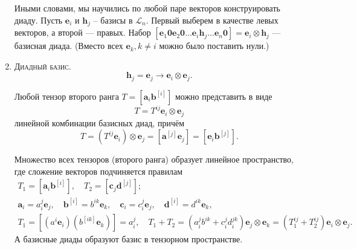 \begin{definition}[геометрическое]
\begin{enumerate}
    Иными словами, мы научились по любой паре векторов конструировать диаду. Пусть $\mathbf{e}_i$ и
    $\mathbf{h}_j$ -- базисы в $\mathcal{L}_n$. Первый выберем в качестве левых векторов, а
    второй --- правых. Набор $[\mathbf{e}_1 \mathbf{0} \mathbf{e}_2 \mathbf{0}
    \dots \mathbf{e}_i \mathbf{h}_j \dots \mathbf{e}_n \mathbf{0}] =
    \mathbf{e}_i \otimes \mathbf{h}_j$ --- базисная диада. (Вместо всех
    $\mathbf{e}_k, k\neq i$ можно было поставить нули.) 

  \item \textsc{Диадный базис.} %
  	\begin{equation*}
  		\mathbf{h}_j = \mathbf{e}_j \longrightarrow \mathbf{e}_i \otimes
      \mathbf{e}_j.
  	\end{equation*}
  
    \begin{theorem}
      Любой тензор второго ранга $ T = [\mathbf{a}_i \mathbf{b}^{[i]}]$ можно представить в виде
      \begin{equation}\label{lec_2:eq:tensor_basis}
        T = T^{ij} \mathbf{e}_i \otimes \mathbf{e}_j
      \end{equation}
      линейной комбинации базисных диад, причём
      \[
        T = (T^{ij} \mathbf{e}_i) \otimes \mathbf{e}_j
        = [\mathbf{a}^{[j]} \mathbf{e}_j]
        = [\mathbf{e}_i \mathbf{b}^{[j]}].
      \]
    \end{theorem}
    \begin{corollary*}
      Множество всех тензоров (второго ранга) образует линейное пространство,
      где сложение векторов подчиняется правилам
      \begin{gather*}
        T_1 = [\mathbf{a}_i \mathbf{b}^{[i]}], \quad
        T_2 = [\mathbf{c}_j \mathbf{d}^{[j]}]; \\
        \mathbf{a}_i = a^j_i \mathbf{e}_j, \quad
        \mathbf{b}^{[i]} = b^{ik} \mathbf{e}_k,\quad
        \mathbf{c}_i = c^{j}_{i} \mathbf{e}_j, \quad
        \mathbf{d}^{[i]} = d^{ik} \mathbf{e}_k,  \\
        T_1 = [(a^i \mathbf{e}_i) (b^{[ik]} \mathbf{e}_k)] = a^j_i, \quad
        T_1 + T_2 = (a^j_i b^{ik} + c^{j}_i d^{jk}_i) \mathbf{e}_j \otimes \mathbf{e}_k
        = (T_1^{ij} + T_2^{ij}) \mathbf{e}_i \otimes \mathbf{e}_j.
      \end{gather*}
      А базисные диады образуют базис в тензорном пространстве.
    \end{corollary*}
  \end{enumerate}
\end{definition}
\renewcommand{\thedefinition}{\arabic{definition}}

